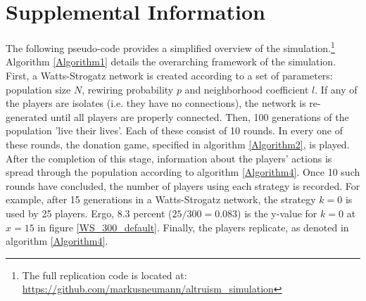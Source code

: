 \documentclass[12pt]{article}
\begin{document}
\newpage




\newpage
\section*{Supplemental Information}
The following pseudo-code provides a simplified overview of the simulation.\footnote{The full replication code is located at: \url{https://github.com/markusneumann/altruism_simulation}} Algorithm \ref{Algorithm1} details the overarching framework of the simulation. First, a Watts-Strogatz network is created according to a set of parameters: population size $N$, rewiring probability $p$ and neighborhood coefficient $l$. If any of the players are isolates (i.e. they have no connections), the network is re-generated until all players are properly connected. Then, 100 generations of the population 'live their lives'. Each of these consist of 10 rounds. In every one of these rounds, the donation game, specified in algorithm \ref{Algorithm2}, is played. After the completion of this stage, information about the players' actions is spread through the population according to algorithm \ref{Algorithm4}. Once 10 such rounds have concluded, the number of players using each strategy is recorded. For example, after 15 generations in a Watts-Strogatz network, the strategy $k=0$ is used by 25 players. Ergo, 8.3 percent ($25/300=0.083$) is the y-value for $k=0$ at $x=15$ in figure \ref{WS_300_default}. Finally, the players replicate, as denoted in algorithm \ref{Algorithm4}.


\end{document}
